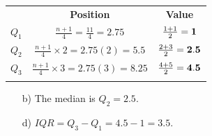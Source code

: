\documentclass[12pt]{article}
\begin{document}
{\begin{minipage}[t]{0.98\textwidth}
\begin{minipage}[t]{0.47\textwidth}
\begin{tabular}{c|c|c}
 & {\bf Position} & {\bf Value} \\[0.1cm]
$Q_1$ & $\tfrac{n+1}{4} = \tfrac{11}{4} = 2.75$ & $\tfrac{1+1}{2} = {\bf1}$\\[0.3cm]
$Q_2$ & $\tfrac{n+1}{4}\times2 = 2.75(2) = 5.5$ & $\tfrac{2+3}{2} = {\bf2.5}$\\[0.3cm]
$Q_3$ & $\tfrac{n+1}{4}\times3 = 2.75(3) = 8.25$ & $\tfrac{4+5}{2} = {\bf4.5}$\\
\multicolumn{3}{c}{}\\
\end{tabular}
\begin{enumerate}
\item[b)] The median is $Q_2 = 2.5.$
\item[d)] $IQR = Q_3 - Q_1 = 4.5 - 1 = 3.5.$
\end{enumerate}
\end{minipage}
\end{minipage}}\vspace{0.03\textwidth}

\newpage
\end{document}

